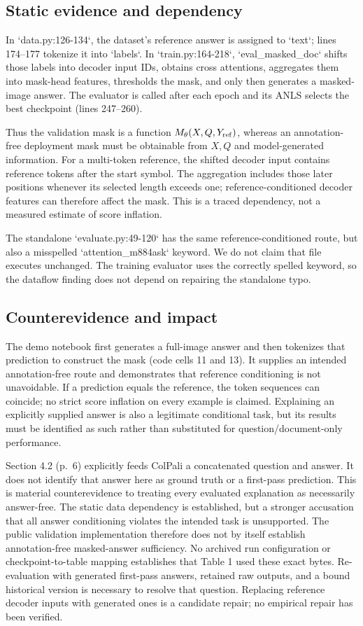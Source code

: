 \documentclass[10pt]{article}
\begin{document}
\subsection*{Static evidence and dependency}
In `data.py:126-134`, the dataset’s reference answer is assigned to `text`; lines 174–177 tokenize it into `labels`. In `train.py:164-218`, `eval\_masked\_doc` shifts those labels into decoder input IDs, obtains cross attentions, aggregates them into mask-head features, thresholds the mask, and only then generates a masked-image answer. The evaluator is called after each epoch and its ANLS selects the best checkpoint (lines 247–260).\par
Thus the validation mask is a function \(M_\theta(X,Q,Y_{\rm ref})\), whereas an annotation-free deployment mask must be obtainable from \(X,Q\) and model-generated information. For a multi-token reference, the shifted decoder input contains reference tokens after the start symbol. The aggregation includes those later positions whenever its selected length exceeds one; reference-conditioned decoder features can therefore affect the mask. This is a traced dependency, not a measured estimate of score inflation.\par
The standalone `evaluate.py:49-120` has the same reference-conditioned route, but also a misspelled `attention\_m884ask` keyword. We do not claim that file executes unchanged. The training evaluator uses the correctly spelled keyword, so the dataflow finding does not depend on repairing the standalone typo.\par
\subsection*{Counterevidence and impact}
The demo notebook first generates a full-image answer and then tokenizes that prediction to construct the mask (code cells 11 and 13). It supplies an intended annotation-free route and demonstrates that reference conditioning is not unavoidable. If a prediction equals the reference, the token sequences can coincide; no strict score inflation on every example is claimed. Explaining an explicitly supplied answer is also a legitimate conditional task, but its results must be identified as such rather than substituted for question/document-only performance.\par
Section 4.2 (p. 6) explicitly feeds ColPali a concatenated question and answer. It does not identify that answer here as ground truth or a first-pass prediction. This is material counterevidence to treating every evaluated explanation as necessarily answer-free. The static data dependency is established, but a stronger accusation that all answer conditioning violates the intended task is unsupported. The public validation implementation therefore does not by itself establish annotation-free masked-answer sufficiency. No archived run configuration or checkpoint-to-table mapping establishes that Table 1 used these exact bytes. Re-evaluation with generated first-pass answers, retained raw outputs, and a bound historical version is necessary to resolve that question. Replacing reference decoder inputs with generated ones is a candidate repair; no empirical repair has been verified.\par
\end{document}
